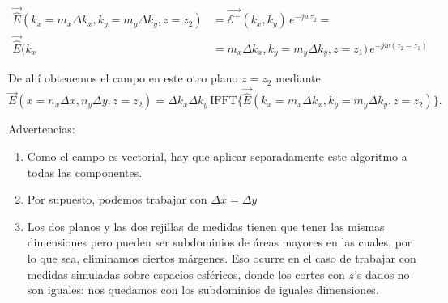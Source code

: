 \documentclass[twocolumn,tikz]{handout}
\begin{document}
\begin{itemize}
\begin{align}
\vec{\hat{E}}(k_{x}=m_{x}\Delta k_{x},k_{y}=m_{y} \Delta
k_{y},z=z_{2})&=\vec{\mathcal{E}^{+}}(k_{x},k_{y})\,e^{-j w
z_{2}}=\nonumber
\\
\vec{\hat{E}}(k_{x}&=m_{x}\Delta k_{x},k_{y}=m_{y} \Delta
k_{y},z=z_{1})\,e^{-j w (z_{2}-z_{1})}
\end{align}

De ahí obtenemos el campo en este otro plano $z=z_{2}$ mediante
\begin{equation}
\vec{E}(x=n_{x}\Delta x,n_{y} \Delta y,z=z_{2})=\Delta k_{x} \Delta
k_{y}\,\mbox{IFFT}\{\vec{\hat{E}}(k_{x}=m_{x}\Delta
k_{x},k_{y}=m_{y} \Delta k_{y},z=z_{2})\}.
\end{equation}


\end{itemize}

Advertencias:
\begin{enumerate}
\item Como el campo es vectorial, hay que aplicar separadamente este
algoritmo a todas las componentes.
\item Por supuesto, podemos trabajar con $\Delta x=\Delta y$
\item Los dos planos y las dos rejillas de medidas tienen que tener las mismas
dimensiones pero pueden ser subdominios de áreas mayores en las
cuales, por lo que sea, eliminamos ciertos márgenes. Eso ocurre en
el caso de trabajar con medidas simuladas sobre espacios esféricos,
donde los cortes con $z$'s dados no son iguales: nos quedamos con
los subdominios de iguales dimensiones.
\end{enumerate}
\end{document}
